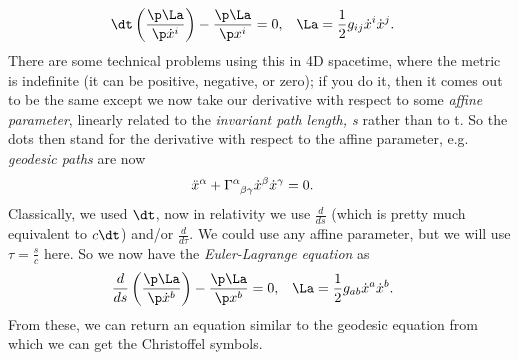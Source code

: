 \documentclass[a4paper, 11pt, normalem]{report}
\begin{document}
\begin{align}
    \dt\left(\frac{\p\La}{\p\dot{x}^i}\right) - \frac{\p\La}{\p x^i} &= 0, & \La &= \frac12g_{ij}\dot{x}^i\dot{x}^j.
\end{align}
There are some technical problems using this in 4D spacetime, where the metric is indefinite (it can be positive, negative, or zero); if you do it, then it comes out to be the same except we now take our derivative with respect to some \emph{affine parameter}, linearly related to the \emph{invariant path length, s} rather than to t.
So the dots then stand for the derivative with respect to the affine parameter, e.g. \emph{geodesic paths} are now
\begin{align}
    \ddot{x}^\alpha + \tensor{\Gamma}{^\alpha_{\beta\gamma}}\dot{x}^\beta\dot{x}^\gamma &= 0.
\end{align}
Classically, we used $\dt$, now in relativity we use $\frac{d}{ds}$ (which is pretty much equivalent to $c\dt$) and/or $\frac{d}{d\tau}$.
We could use any affine parameter, but we will use $\tau=\frac{s}{c}$ here. 
So we now have the \emph{Euler-Lagrange equation} as
\begin{align}
    \frac{d}{ds}\left(\frac{\p\La}{\p\dot{x}^b}\right) - \frac{\p\La}{\p x^b} &= 0, & \La &= \frac12g_{ab}\dot{x}^a\dot{x}^b.
\end{align}
From these, we can return an equation similar to the geodesic equation from which we can get the Christoffel symbols. 
\end{document}
